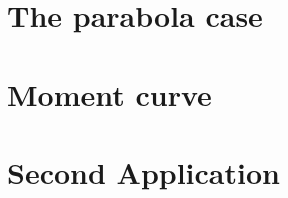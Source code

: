 \documentclass[10pt,twoside,notitlepage]{report}
\theoremstyle{plain}
\theoremstyle{definition}
\newcommand{\1}{\mathbbm{1}}
\begin{document}
\chapter{The parabola case}

\chapter{Moment curve}


\chapter{Second Application}



\end{document}
